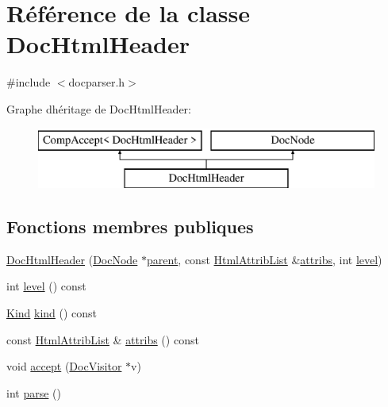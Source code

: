 \hypertarget{class_doc_html_header}{}\section{Référence de la classe Doc\+Html\+Header}
\label{class_doc_html_header}


{\ttfamily \#include $<$docparser.\+h$>$}

Graphe d\textquotesingle{}héritage de Doc\+Html\+Header\+:\begin{figure}[H]
\begin{center}
\leavevmode
\includegraphics[height=2.000000cm]{class_doc_html_header}
\end{center}
\end{figure}
\subsection*{Fonctions membres publiques}
\begin{DoxyCompactItemize}
\item 
\hyperlink{class_doc_html_header_ad2f8ab500ca062906991a8f5e9a41348}{Doc\+Html\+Header} (\hyperlink{class_doc_node}{Doc\+Node} $\ast$\hyperlink{class_doc_node_a990d8b983962776a647e6231d38bd329}{parent}, const \hyperlink{class_html_attrib_list}{Html\+Attrib\+List} \&\hyperlink{class_doc_html_header_ad9d44e29828820f9a24a44313e59d699}{attribs}, int \hyperlink{class_doc_html_header_ae1acc15800505e9eeacbd045ee5d77ca}{level})
\item 
int \hyperlink{class_doc_html_header_ae1acc15800505e9eeacbd045ee5d77ca}{level} () const 
\item 
\hyperlink{class_doc_node_aebd16e89ca590d84cbd40543ea5faadb}{Kind} \hyperlink{class_doc_html_header_aa2db7940be2aec52a9eaa1074743a90d}{kind} () const 
\item 
const \hyperlink{class_html_attrib_list}{Html\+Attrib\+List} \& \hyperlink{class_doc_html_header_ad9d44e29828820f9a24a44313e59d699}{attribs} () const 
\item 
void \hyperlink{class_doc_html_header_a6eb2ce828e30e808a5f1d362cfa057d4}{accept} (\hyperlink{class_doc_visitor}{Doc\+Visitor} $\ast$v)
\item 
int \hyperlink{class_doc_html_header_a36873fbacdfe8c26550845b8d79f7dbc}{parse} ()
\end{DoxyCompactItemize}
